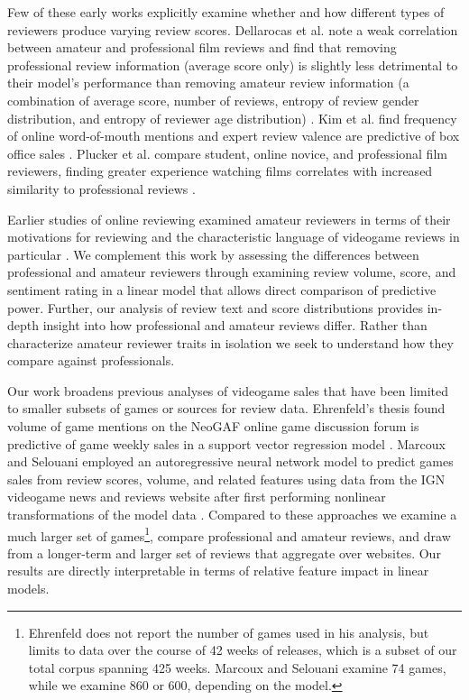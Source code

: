 \documentclass{sig-alternate}
\begin{document}
Few of these early works explicitly examine whether and how different types of reviewers produce varying review scores. 
Dellarocas et al. note a weak correlation between amateur and professional film reviews and find that removing professional review information (average score only) is slightly less detrimental to their model's performance than removing amateur review information (a combination of average score, number of reviews, entropy of review gender distribution, and entropy of reviewer age distribution) \cite{dellarocas2007exploring}. 
Kim et al. find frequency of online word-of-mouth mentions and expert review valence are predictive of box office sales \cite{kim2013moviewom}.
Plucker et al. compare student, online novice, and professional film reviewers, finding greater experience watching films correlates with increased similarity to professional reviews \cite{plucker2009pro-novice-eval}. 

Earlier studies of online reviewing examined amateur reviewers in terms of their motivations for reviewing \cite{gilbert2010deja, diakopoulos2011news-discourse, xu2012critique} and the characteristic language of videogame reviews in particular \cite{zagal2011natural}. We complement this work by assessing the differences between professional and amateur reviewers through examining review volume, score, and sentiment rating in a linear model that allows direct comparison of predictive power. Further, our analysis of review text and score distributions provides in-depth insight into how professional and amateur reviews differ. Rather than characterize amateur reviewer traits in isolation we seek to understand how they compare against professionals.

Our work broadens previous analyses of videogame sales that have been limited to smaller subsets of games or sources for review data. Ehrenfeld's thesis found volume of game mentions on the NeoGAF online game discussion forum is predictive of game weekly sales in a support vector regression model \cite{ehrenfeld2011predicting}. Marcoux and Selouani employed an autoregressive neural network model to predict games sales from review scores, volume, and related features using data from the IGN videogame news and reviews website after first performing nonlinear transformations of the model data \cite{marcoux2009hybrid}.
Compared to these approaches we examine a much larger set of
games\footnote{Ehrenfeld does not report the number of games used in his
analysis, but limits to data over the course of 42 weeks of releases,
which is a subset of our total corpus spanning 425 weeks. Marcoux and
Selouani examine 74 games, while we examine 860 or 600, depending on the
model.},
compare professional and amateur reviews, and draw from a longer-term and larger set of reviews that aggregate over websites. Our results are directly interpretable in terms of relative feature impact in linear models.
\end{document}
